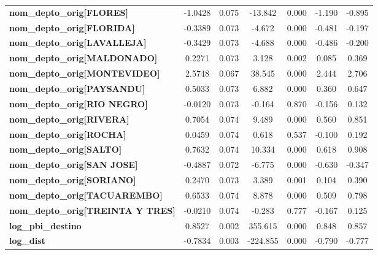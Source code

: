 \begin{center}
\begin{tabular}{lcccccc}
\textbf{nom\_depto\_orig[FLORES]}         &      -1.0428  &        0.075     &   -13.842  &         0.000        &       -1.190    &       -0.895     \\
\textbf{nom\_depto\_orig[FLORIDA]}        &      -0.3389  &        0.073     &    -4.672  &         0.000        &       -0.481    &       -0.197     \\
\textbf{nom\_depto\_orig[LAVALLEJA]}      &      -0.3429  &        0.073     &    -4.688  &         0.000        &       -0.486    &       -0.200     \\
\textbf{nom\_depto\_orig[MALDONADO]}      &       0.2271  &        0.073     &     3.128  &         0.002        &        0.085    &        0.369     \\
\textbf{nom\_depto\_orig[MONTEVIDEO]}     &       2.5748  &        0.067     &    38.545  &         0.000        &        2.444    &        2.706     \\
\textbf{nom\_depto\_orig[PAYSANDU]}       &       0.5033  &        0.073     &     6.882  &         0.000        &        0.360    &        0.647     \\
\textbf{nom\_depto\_orig[RIO NEGRO]}      &      -0.0120  &        0.073     &    -0.164  &         0.870        &       -0.156    &        0.132     \\
\textbf{nom\_depto\_orig[RIVERA]}         &       0.7054  &        0.074     &     9.489  &         0.000        &        0.560    &        0.851     \\
\textbf{nom\_depto\_orig[ROCHA]}          &       0.0459  &        0.074     &     0.618  &         0.537        &       -0.100    &        0.192     \\
\textbf{nom\_depto\_orig[SALTO]}          &       0.7632  &        0.074     &    10.334  &         0.000        &        0.618    &        0.908     \\
\textbf{nom\_depto\_orig[SAN JOSE]}       &      -0.4887  &        0.072     &    -6.775  &         0.000        &       -0.630    &       -0.347     \\
\textbf{nom\_depto\_orig[SORIANO]}        &       0.2470  &        0.073     &     3.389  &         0.001        &        0.104    &        0.390     \\
\textbf{nom\_depto\_orig[TACUAREMBO]}     &       0.6533  &        0.074     &     8.878  &         0.000        &        0.509    &        0.798     \\
\textbf{nom\_depto\_orig[TREINTA Y TRES]} &      -0.0210  &        0.074     &    -0.283  &         0.777        &       -0.167    &        0.125     \\
\textbf{log\_pbi\_destino}                &       0.8527  &        0.002     &   355.615  &         0.000        &        0.848    &        0.857     \\
\textbf{log\_dist}                        &      -0.7834  &        0.003     &  -224.855  &         0.000        &       -0.790    &       -0.777     \\
\bottomrule
\end{tabular}
\end{center}